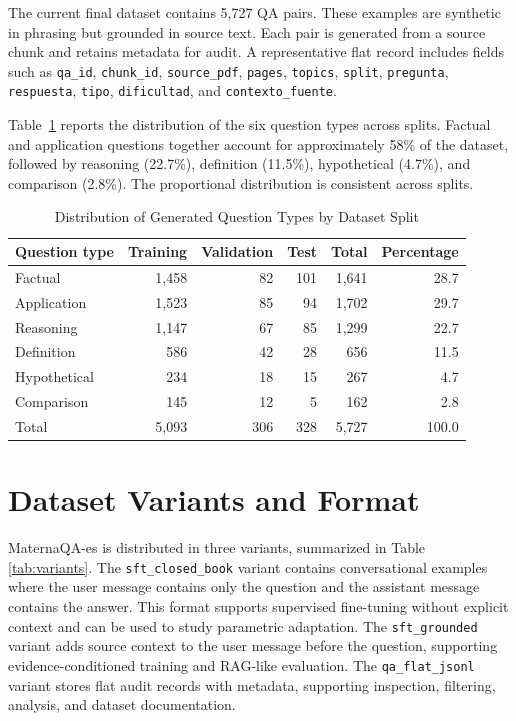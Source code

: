 \documentclass[conference]{IEEEtran}
\begin{document}
The current final dataset contains 5,727 QA pairs. These examples are synthetic in phrasing but grounded in source text. Each pair is generated from a source chunk and retains metadata for audit. A representative flat record includes fields such as \texttt{qa\_id}, \texttt{chunk\_id}, \texttt{source\_pdf}, \texttt{pages}, \texttt{topics}, \texttt{split}, \texttt{pregunta}, \texttt{respuesta}, \texttt{tipo}, \texttt{dificultad}, and \texttt{contexto\_fuente}.

Table~\ref{tab:question_types} reports the distribution of the six question types across splits. Factual and application questions together account for approximately 58\% of the dataset, followed by reasoning (22.7\%), definition (11.5\%), hypothetical (4.7\%), and comparison (2.8\%). The proportional distribution is consistent across splits.

\begin{table}[t]
\caption{Distribution of Generated Question Types by Dataset Split}
\label{tab:question_types}
\centering
\scriptsize
\setlength{\tabcolsep}{2pt}
\begin{tabular}{|p{}|r|r|r|r|r|}
\hline
\textbf{Question type} & \textbf{Training} & \textbf{Validation} & \textbf{Test} & \textbf{Total} & \textbf{Percentage} \\
\hline
Factual & 1,458 & 82 & 101 & 1,641 & 28.7 \\
Application & 1,523 & 85 & 94 & 1,702 & 29.7 \\
Reasoning & 1,147 & 67 & 85 & 1,299 & 22.7 \\
Definition & 586 & 42 & 28 & 656 & 11.5 \\
Hypothetical & 234 & 18 & 15 & 267 & 4.7 \\
Comparison & 145 & 12 & 5 & 162 & 2.8 \\
\hline
Total & 5,093 & 306 & 328 & 5,727 & 100.0 \\
\hline
\end{tabular}
\end{table}

\section{Dataset Variants and Format}
MaternaQA-es is distributed in three variants, summarized in Table \ref{tab:variants}. The \texttt{sft\_closed\_book} variant contains conversational examples where the user message contains only the question and the assistant message contains the answer. This format supports supervised fine-tuning without explicit context and can be used to study parametric adaptation. The \texttt{sft\_grounded} variant adds source context to the user message before the question, supporting evidence-conditioned training and RAG-like evaluation. The \texttt{qa\_flat\_jsonl} variant stores flat audit records with metadata, supporting inspection, filtering, analysis, and dataset documentation.
\end{document}
